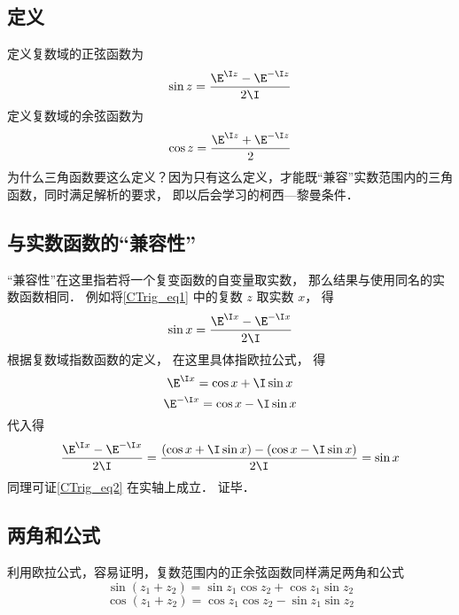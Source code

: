 
\subsection{定义}
定义复数域的正弦函数为
\begin{equation}\label{CTrig_eq1}
\sin z = \frac{\E^{\I z} - \E^{-\I z}}{2\I}
\end{equation}
定义复数域的余弦函数为
\begin{equation}\label{CTrig_eq2}
\cos z = \frac{\E^{\I z} + \E^{-\I z}}{2}
\end{equation}
为什么三角函数要这么定义？因为只有这么定义，才能既“兼容”实数范围内的三角函数，同时满足解析的要求， 即以后会学习的柯西—黎曼条件．

\subsection{与实数函数的“兼容性”}
“兼容性”在这里指若将一个复变函数的自变量取实数， 那么结果与使用同名的实数函数相同． 例如将\autoref{CTrig_eq1} 中的复数 $z$ 取实数 $x$， 得
\begin{equation}
\sin x = \frac{\E^{\I x} - \E^{-\I x}}{2\I}
\end{equation} 
根据复数域指数函数的定义， 在这里具体指欧拉公式， 得
\begin{equation}
\E^{\I x} = \cos x + \I\sin x
\end{equation} 
\begin{equation}
\E^{-\I x} = \cos x - \I \sin x
\end{equation} 
代入得
\begin{equation}
\frac{\E^{\I x} - \E^{-\I x}}{2\I} = \frac{(\cos x + \I\sin x) - (\cos x - \I\sin x)}{2\I} = \sin x
\end{equation}  
同理可证\autoref{CTrig_eq2} 在实轴上成立． 证毕．

\subsection{两角和公式}
利用欧拉公式，容易证明，复数范围内的正余弦函数同样满足两角和公式
\begin{equation}\label{CTrig_eq3}
\sin(z_1 + z_2) = \sin {z_1}\cos {z_2} + \cos {z_1}\sin {z_2}
\end{equation}
\begin{equation}\label{CTrig_eq4}
\cos (z_1 + z_2) = \cos {z_1}\cos {z_2} - \sin {z_1}\sin {z_2}
\end{equation}
